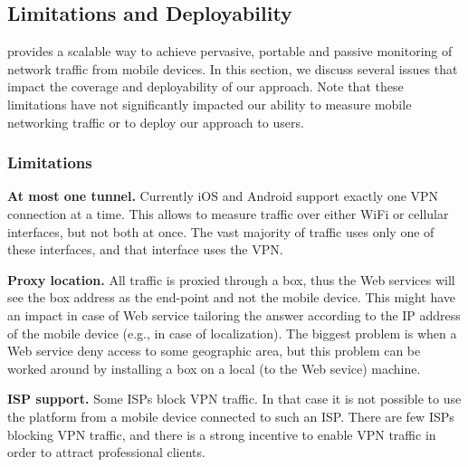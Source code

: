 


\subsection{Limitations and Deployability}
\label{sec:addit-limit}

\platname{} provides a scalable way to achieve pervasive, portable 
and passive monitoring of network traffic from mobile devices. In 
this section, we discuss several issues that impact the coverage 
and deployability of our approach. Note that these limitations have 
not significantly impacted our ability to measure mobile networking 
traffic or to deploy our approach to users.

\subsubsection{Limitations}


\noindent\textbf{At most one tunnel.} Currently iOS and Android 
support exactly one VPN connection at a time. This allows \platname{} 
to measure traffic over either WiFi or cellular interfaces, but not both at once. 
The vast majority of traffic uses only one of these interfaces, 
and that interface uses the VPN.

\noindent\textbf{Proxy location.} All traffic is proxied through a \platname{} box, thus the Web
services will see the \platname{} box address as the end-point and not
the mobile device. This might have an impact in case of Web service
tailoring the answer according to the IP address of the mobile device
(e.g., in case of localization). The biggest problem is when a Web
service deny access to some geographic area, but this problem can be
worked around by installing a \platname{} box on a local (to the Web
sevice) machine.

\noindent\textbf{ISP support.} Some ISPs block VPN traffic. In that case it is not possible
to use the \platname{} platform from a mobile device connected to
such an ISP. There are few ISPs blocking VPN traffic, and there is a
strong incentive to enable VPN traffic in order to attract
professional clients. 

